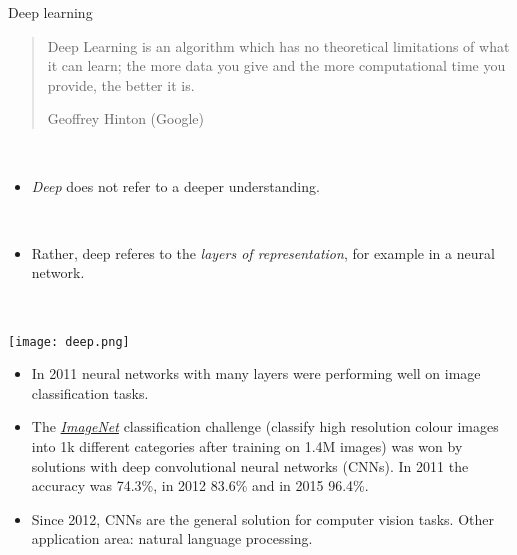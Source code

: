 \documentclass[
  10pt,
  ignorenonframetext,
]{beamer}
\providecommand{\tightlist}{%
  \setlength{\itemsep}{0pt}\setlength{\parskip}{0pt}}
\begin{document}
\begin{frame}
\begin{block}{Deep learning}
\protect\hypertarget{deep-learning}{}
\(~\)

\begin{quote}
Deep Learning is an algorithm which has no theoretical limitations of what it can learn; the more data you give and the more computational time you provide, the better it is. 

Geoffrey Hinton (Google)
\end{quote}

\(~\)

\begin{itemize}
\tightlist
\item
  \emph{Deep} does not refer to a deeper understanding.
\end{itemize}

\(~\)

\begin{itemize}
\tightlist
\item
  Rather, deep referes to the \emph{layers of representation}, for
  example in a neural network.
\end{itemize}

\(~\)

\center

\texttt{[image: deep.png]}
\end{block}
\end{frame}

\begin{frame}
\begin{itemize}
\tightlist
\item
  In 2011 neural networks with many layers were performing well on image
  classification tasks.
\end{itemize}

\vspace{2mm}

\begin{itemize}
\tightlist
\item
  The \href{http://www.image-net.org/}{\emph{ImageNet}} classification
  challenge (classify high resolution colour images into 1k different
  categories after training on 1.4M images) was won by solutions with
  deep convolutional neural networks (CNNs). In 2011 the accuracy was
  74.3\%, in 2012 83.6\% and in 2015 96.4\%.
\end{itemize}

\vspace{2mm}

\begin{itemize}
\tightlist
\item
  Since 2012, CNNs are the general solution for computer vision tasks.
  Other application area: natural language processing.
\end{itemize}
\end{frame}
\end{document}
